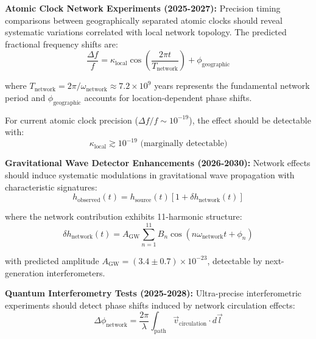 \documentclass[11pt,a4paper]{article}
\begin{document}
\textbf{Atomic Clock Network Experiments (2025-2027):}
Precision timing comparisons between geographically separated atomic clocks should reveal systematic variations correlated with local network topology. The predicted fractional frequency shifts are:
\begin{equation}
\frac{\Delta f}{f} = \kappa_{\text{local}} \cos\left(\frac{2\pi t}{T_{\text{network}}}\right) + \phi_{\text{geographic}}
\label{eq:atomic_clock_prediction}
\end{equation}

where $T_{\text{network}} = 2\pi/\omega_{\text{network}} \approx 7.2 \times 10^{9}$ years represents the fundamental network period and $\phi_{\text{geographic}}$ accounts for location-dependent phase shifts.

For current atomic clock precision ($\Delta f/f \sim 10^{-19}$), the effect should be detectable with:
\begin{equation}
\kappa_{\text{local}} \gtrsim 10^{-19} \text{ (marginally detectable)}
\label{eq:atomic_clock_sensitivity}
\end{equation}

\textbf{Gravitational Wave Detector Enhancements (2026-2030):}
Network effects should induce systematic modulations in gravitational wave propagation with characteristic signatures:
\begin{equation}
h_{\text{observed}}(t) = h_{\text{source}}(t) \left[1 + \delta h_{\text{network}}(t)\right]
\label{eq:gravitational_wave_modulation}
\end{equation}

where the network contribution exhibits 11-harmonic structure:
\begin{equation}
\delta h_{\text{network}}(t) = A_{\text{GW}} \sum_{n=1}^{11} B_n \cos(n\omega_{\text{network}} t + \phi_n)
\label{eq:gravitational_wave_harmonics}
\end{equation}

with predicted amplitude $A_{\text{GW}} = (3.4 \pm 0.7) \times 10^{-23}$, detectable by next-generation interferometers.

\textbf{Quantum Interferometry Tests (2025-2028):}
Ultra-precise interferometric experiments should detect phase shifts induced by network circulation effects:
\begin{equation}
\Delta \phi_{\text{network}} = \frac{2\pi}{\lambda} \int_{\text{path}} \vec{v}_{\text{circulation}} \cdot d\vec{l}
\label{eq:interferometric_phase_shift}
\end{equation}
\end{document}
